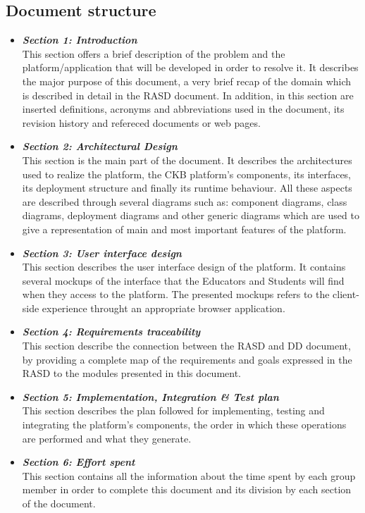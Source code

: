 \documentclass{article}
\begin{document}
{\subsection{Document structure}
\begin{itemize}
    \item \textbf{\textit{Section 1: Introduction}} \\
          This section offers a brief description of the problem and the platform/application that will be developed in order to resolve it.
          It describes the major purpose of this document, a very brief recap of the domain which is
          described in detail in the RASD document.
          In addition, in this section are inserted definitions, acronyms and abbreviations used in the document,
          its revision history and refereced documents or web pages.
    \item \textbf{\textit{Section 2: Architectural Design}} \\
          This section is the main part of the document. It describes the architectures used to
          realize the platform, the CKB platform's components, its interfaces, its deployment
          structure and finally its runtime behaviour.
          All these aspects are described through several diagrams such as:
          component diagrams, class diagrams, deployment diagrams and other
          generic diagrams which are used to give a representation of main and most important
          features of the platform.
    \item \textbf{\textit{Section 3: User interface design}} \\
          This section describes the user interface design of the platform.
          It contains several mockups of the interface that the Educators and
          Students will find when they access to the platform. The presented mockups
          refers to the client-side experience throught an appropriate browser application.
    \item \textbf{\textit{Section 4: Requirements traceability}} \\
          This section describe the connection between the RASD and DD document,
          by providing a complete map of the requirements and goals expressed in the RASD
          to the modules presented in this document.
    \item \textbf{\textit{Section 5: Implementation, Integration \& Test plan}} \\
          This section describes the plan followed for implementing, testing and
          integrating the platform's components, the order in which
          these operations are performed and what they generate.
    \item \textbf{\textit{Section 6: Effort spent}} \\
          This section contains all the information about the time spent by each group member
          in order to complete this document and its division by each section of the document.
\end{itemize}
\newpage
\pagestyle{ArchitecturalDesignStyle}
}
\end{document}
